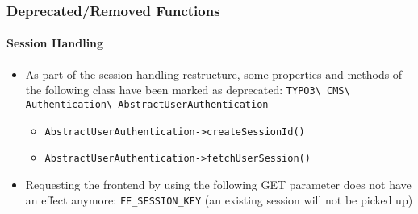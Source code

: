 %

\begin{frame}[fragile]
	\frametitle{Deprecated/Removed Functions}
	\framesubtitle{Session Handling}

	\begin{itemize}
		\item As part of the session handling restructure, some properties and methods
			of the following class have been marked as deprecated:\newline
			\vspace{0.2cm}
			\smaller\texttt{TYPO3\textbackslash
				CMS\textbackslash
				Authentication\textbackslash
				AbstractUserAuthentication}\normalsize

			\begin{itemize}\small
				\item \texttt{AbstractUserAuthentication->createSessionId()}
				\item \texttt{AbstractUserAuthentication->fetchUserSession()}
			\end{itemize}\normalsize

		\item Requesting the frontend by using the following GET parameter does
			not have an effect anymore: \small\texttt{FE\_SESSION\_KEY}\normalsize\newline
			(an existing session will not be picked up)

	\end{itemize}

\end{frame}

